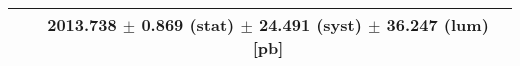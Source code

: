 \begin{tabular}{lc}
\hline
                               & 2013.738 $\pm$ 0.869 (stat) $\pm$ 24.491 (syst) $\pm$ 36.247 (lum) [pb]  \\
\hline
\end{tabular}
